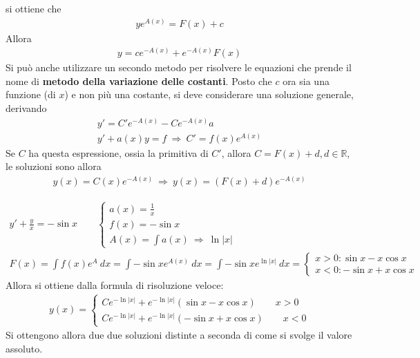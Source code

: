 \documentclass[a4paper, oneside]{book}
\begin{document}
si ottiene che 
\begin{gather*}
    ye^{A(x)} = F(x) + c
\end{gather*}
Allora 
\begin{align}
    y = ce^{-A(x)} + e^{-A(x)}F(x)   
\end{align}
Si può anche utilizzare un secondo metodo per risolvere le equazioni 
che prende il nome di \textbf{metodo della variazione delle costanti}.
Posto che $c$ ora sia una funzione (di $x$) e non più una costante, si deve
considerare una soluzione generale, derivando
\begin{gather*}
    y' = C'e^{-A(x)} - Ce^{-A(x)}a  \\
    y' + a(x)y = f \ \Longrightarrow \ C' = f(x) e^{A(x)} 
\end{gather*}
Se $C$ ha questa espressione, ossia la primitiva di $C'$, allora 
$C = F(x) + d, d\in \mathbb{R}$, le soluzioni sono allora
\begin{gather*}
    y(x) = C(x)e^{-A(x)} \ \Longrightarrow \ y(x) = (F(x) + d)e^{-A(x)}  
\end{gather*}

\begin{example}
    \begin{gather*}
        y' + \frac{y}{x}= -\sin x \qquad \left\{\begin{array}{l}
            a(x) = \frac{1}{x} \\
            f(x) = -\sin x\\
            A(x) = \int a(x) \ \Longrightarrow \ \ln |x|
        \end{array}\right. \\
        F(x) = \int f(x) e^{A} \ dx = \int -\sin x e^{A(x)}\ dx = \int -\sin x e^{\ln|x|} \ dx   = \left\{\begin{array}{l}
            x > 0 : \sin x - x\cos x \\
            x < 0 : -\sin x + x\cos x 
        \end{array}\right. 
    \end{gather*}
    Allora si ottiene dalla formula di risoluzione veloce:
    \begin{gather*}
        y(x) = \left\{\begin{array}{l}
            Ce^{-\ln|x|} + e^{-\ln|x|} (\sin x - x\cos x) \qquad x > 0 \\
            Ce^{-\ln|x|} + e^{-\ln|x|} (-\sin x + x\cos x) \qquad x < 0  
        \end{array}\right.
    \end{gather*}
    Si ottengono allora due due soluzioni distinte a seconda di come si
    svolge il valore assoluto.
\end{example}
\end{document}
